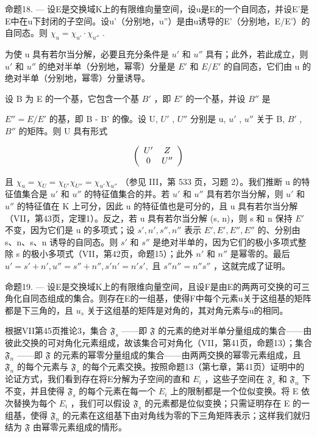 命题18. --- 设E是交换域K上的有限维向量空间，设u是E的一个自同态，并设E'是E中在u下封闭的子空间。设u'（分别地，u''）是由u诱导的E'（分别地，E/E'）的自同态。则 \(\chi_{u} = \chi_{u'} \cdot \chi_{u''}\) .

为使 u 具有若尔当分解，必要且充分条件是 \(u'\) 和 \(u''\) 具有；此外，若此成立，则 \(u'\) 和 \(u''\) 的绝对半单（分别地，幂零）分量是 \(E'\) 和 \(E/E'\) 的自同态，它们由 u 的绝对半单（分别地，幂零）分量诱导。

设 B 为 E 的一个基，它包含一个基 \(B'\) ，即 \(E'\) 的一个基，并设 \(B''\) 是

\(E'' = E/E'\) 的基，即 B - B' 的像。设 U, \(U'\) , \(U''\) 分别是 u, \(u'\) , \(u''\) 关于 B, \(B'\) , \(B''\) 的矩阵。则 U 具有形式

\[
\left( \begin{array}{c c} U ^ {\prime} & Z \\ 0 & U ^ {\prime \prime} \end{array} \right)
\]

且 \(\chi_{u} = \chi_{U} = \chi_{U'} \chi_{U''} = \chi_{u'} \chi_{u''}\) （参见 III，第 533 页，习题 2）。我们推断 u 的特征值集合是 \(u'\) 和 \(u''\) 的特征值集合的并。若 \(u'\) 和 \(u''\) 具有若尔当分解，则 \(u'\) 和 \(u''\) 的特征值在 K 上可分，因此 u 的特征值也是可分的，且 u 具有若尔当分解（VII，第43页，定理1）。反之，若 u 具有若尔当分解 (s, n)，则 s 和 n 保持 \(E'\) 不变，因为它们是 u 的多项式；设 \(s', n', s'', n''\) 表示 \(E', E', E'', E''\) 的、分别由 s、n、s、n 诱导的自同态。则 \(s'\) 和 \(s''\) 是绝对半单的，因为它们的极小多项式整除 s 的极小多项式（VII，第42页，命题15）；此外 \(n'\) 和 \(n''\) 是幂零的。最后 \(u' = s' + n', u'' = s'' + n'', s'n' = n's',\) 且 \(s''n'' = n''s''\) ，这就完成了证明。

命题19. --- 设E是交换域K上的有限维向量空间，且设F是由E的两两可交换的可三角化自同态组成的集合。则存在E的一组基，使得F中每个元素u关于这组基的矩阵都是下三角的，且 \(u_{s}\) 关于这组基的矩阵是对角的，其对角元素与u的相同。

根据VII第45页推论3，集合 \(\mathfrak{F}_s\) ——即 \(\mathfrak{F}\) 的元素的绝对半单分量组成的集合——由彼此交换的可对角化元素组成，故该集合可对角化（VII，第41页，命题13）；集合 \(\mathfrak{F}_n\) ——即 \(\mathfrak{F}\) 的元素的幂零分量组成的集合——由两两交换的幂零元素组成，且 \(\mathfrak{F}_n\) 的每个元素与 \(\mathfrak{F}_s\) 的每个元素交换。按照命题13（第七章，第41页）证明中的论证方式，我们看到存在将E分解为子空间的直和 \(E_i\) ，这些子空间在 \(\mathfrak{F}_s\) 和 \(\mathfrak{F}_n\) 下不变，并且使得 \(\mathfrak{F}_s\) 的每个元素在每一个 \(E_i\) 上的限制都是一个位似变换。将 E 依次替换为每个 \(E_i\) ，我们可以假设 \(\mathfrak{F}_s\) 的元素都是位似变换；只需证明存在 E 的一组基，使得 \(\mathfrak{F}_n\) 的元素在这组基下由对角线为零的下三角矩阵表示；这样我们就归结为 \(\mathfrak{F}\) 由幂零元素组成的情形。

